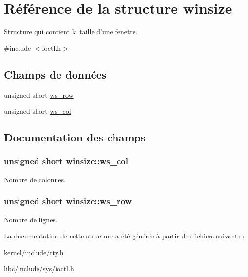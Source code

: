 \hypertarget{structwinsize}{\section{Référence de la structure winsize}
\label{structwinsize}
}


Structure qui contient la taille d'une fenetre.  




{\ttfamily \#include $<$ioctl.\-h$>$}

\subsection*{Champs de données}
\begin{DoxyCompactItemize}
\item 
unsigned short \hyperlink{structwinsize_a73698fa1d966374b0701e4bf225f0141}{ws\-\_\-row}
\item 
unsigned short \hyperlink{structwinsize_a80bedf71a49fd324e0d92d0702cc7005}{ws\-\_\-col}
\end{DoxyCompactItemize}


\subsection{Documentation des champs}
\hypertarget{structwinsize_a80bedf71a49fd324e0d92d0702cc7005}{
\subsubsection[{ws\-\_\-col}]{\setlength{\rightskip}{0pt plus 5cm}unsigned short winsize\-::ws\-\_\-col}}\label{structwinsize_a80bedf71a49fd324e0d92d0702cc7005}
Nombre de colonnes. \hypertarget{structwinsize_a73698fa1d966374b0701e4bf225f0141}{
\subsubsection[{ws\-\_\-row}]{\setlength{\rightskip}{0pt plus 5cm}unsigned short winsize\-::ws\-\_\-row}}\label{structwinsize_a73698fa1d966374b0701e4bf225f0141}
Nombre de lignes. 

La documentation de cette structure a été générée à partir des fichiers suivants \-:\begin{DoxyCompactItemize}
\item 
kernel/include/\hyperlink{tty_8h}{tty.\-h}\item 
libc/include/sys/\hyperlink{ioctl_8h}{ioctl.\-h}\end{DoxyCompactItemize}
